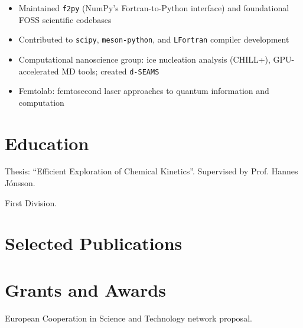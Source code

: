 \documentclass[twopage]{rgcv}
\begin{document}
\sectionspace

\begin{itemize}
\item Maintained \texttt{f2py} (NumPy's Fortran-to-Python interface) and foundational FOSS scientific codebases
\item Contributed to \texttt{scipy}, \texttt{meson-python}, and \texttt{LFortran} compiler development
\end{itemize}

\sectionspace

\begin{itemize}
\item Computational nanoscience group: ice nucleation analysis (CHILL+), GPU-accelerated MD tools; created \texttt{d-SEAMS}
\item Femtolab: femtosecond laser approaches to quantum information and computation
\end{itemize}
\section{Education}

Thesis: ``Efficient Exploration of Chemical Kinetics''. Supervised by Prof. Hannes J\'{o}nsson.

\sectionspace

First Division.
\section{Selected Publications}
\nocite{goswamiEfficientImplementationGaussian2025a,bigiMetatensorMetatomicFoundational2025,Goswami2020,stateOfFortran2022,goswamiAdaptivePruningOA2025,sallermannFlowyHighPerformance2025,goswamiBayesianHierarchicalModels2025,goswamiCompositionalAnalysisFragrance2025}
\printbibliography[heading=none, keyword=selected]
\section{Grants and Awards}

European Cooperation in Science and Technology network proposal.
\end{document}
